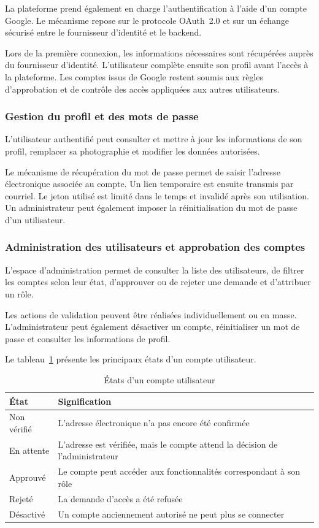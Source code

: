 La plateforme prend également en charge l'authentification à l'aide d'un compte Google. Le mécanisme repose sur le protocole OAuth~2.0 et sur un échange sécurisé entre le fournisseur d'identité et le backend.

Lors de la première connexion, les informations nécessaires sont récupérées auprès du fournisseur d'identité. L'utilisateur complète ensuite son profil avant l'accès à la plateforme. Les comptes issus de Google restent soumis aux règles d'approbation et de contrôle des accès appliquées aux autres utilisateurs.

\subsubsection{Gestion du profil et des mots de passe}

L'utilisateur authentifié peut consulter et mettre à jour les informations de son profil, remplacer sa photographie et modifier les données autorisées.

Le mécanisme de récupération du mot de passe permet de saisir l'adresse électronique associée au compte. Un lien temporaire est ensuite transmis par courriel. Le jeton utilisé est limité dans le temps et invalidé après son utilisation. Un administrateur peut également imposer la réinitialisation du mot de passe d'un utilisateur.

\subsubsection{Administration des utilisateurs et approbation des comptes}

L'espace d'administration permet de consulter la liste des utilisateurs, de filtrer les comptes selon leur état, d'approuver ou de rejeter une demande et d'attribuer un rôle.

Les actions de validation peuvent être réalisées individuellement ou en masse. L'administrateur peut également désactiver un compte, réinitialiser un mot de passe et consulter les informations de profil.

Le tableau~\ref{tab:etats-compte} présente les principaux états d'un compte utilisateur.

\begin{table}[H]
\centering
\caption{États d'un compte utilisateur}
\label{tab:etats-compte}
\small
\begin{tabularx}{\textwidth}{|p{3cm}|X|}
\hline
\textbf{État} & \textbf{Signification} \\
\hline
Non vérifié & L'adresse électronique n'a pas encore été confirmée \\
\hline
En attente & L'adresse est vérifiée, mais le compte attend la décision de l'administrateur \\
\hline
Approuvé & Le compte peut accéder aux fonctionnalités correspondant à son rôle \\
\hline
Rejeté & La demande d'accès a été refusée \\
\hline
Désactivé & Un compte anciennement autorisé ne peut plus se connecter \\
\hline
\end{tabularx}
\end{table}

